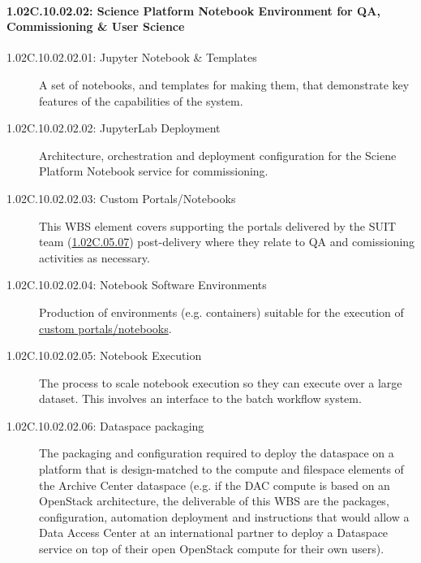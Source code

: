 \paragraph*{1.02C.10.02.02: Science Platform Notebook Environment for QA, Commissioning \& User Science}

\begin{description}

\item[1.02C.10.02.02.01: Jupyter Notebook \& Templates]
  A set of notebooks, and templates for making them, that demonstrate key
  features of the capabilities of the system.

\item[1.02C.10.02.02.02: JupyterLab Deployment]
  Architecture, orchestration and deployment configuration for the Sciene
  Platform Notebook service for commissioning.

\item[1.02C.10.02.02.03: Custom Portals/Notebooks]
  \label{wbs:1.02C.10.02.02.03}
  This WBS element covers supporting the portals delivered by the SUIT team
  (\hyperref[wbs:1.02C.05.08]{1.02C.05.07}) post-delivery where they relate to
  QA and comissioning activities as necessary.

\item[1.02C.10.02.02.04: Notebook Software Environments]
  \label{wbs:1.02C.10.02.02.04}
  Production of environments (e.g. containers) suitable for the execution of
  \hyperref[wbs:1.02C.10.02.02.03]{custom portals/notebooks}.

\item[1.02C.10.02.02.05: Notebook Execution]
  The process to scale notebook execution so they can execute over a large
  dataset. This involves an interface to the batch workflow system.

\item[1.02C.10.02.02.06: Dataspace packaging]
  The packaging and configuration required to deploy the dataspace on a
  platform that is design-matched to the compute and filespace elements of the
  Archive Center dataspace (e.g. if the DAC compute is based on an OpenStack
  architecture, the deliverable of this WBS are the packages, configuration,
  automation deployment and instructions that would allow a Data Access Center
  at an international partner to deploy a Dataspace service on top of their
  open OpenStack compute for their own users).

\end{description}
